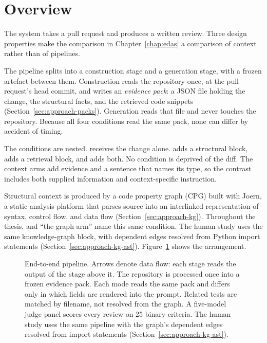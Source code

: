 \section{Overview}
\label{sec:approach-overview}

The system takes a pull request and produces a written review. Three design
properties make the comparison in Chapter~\ref{chap:edas} a comparison of
context rather than of pipelines.

The pipeline splits into a construction stage and a generation stage, with a
frozen artefact between them. Construction reads the repository once, at the
pull request's head commit, and writes an \emph{evidence pack}: a JSON file
holding the change, the structural facts, and the retrieved code snippets
(Section~\ref{sec:approach-packs}). Generation reads that file and never
touches the repository. Because all four conditions read the same pack, none
can differ by accident of timing.

The conditions are nested. \baseline{} receives the change alone. \kg{} adds a
structural block, \rag{} adds a retrieval block, and \hybrid{} adds both. No
condition is deprived of the diff. The context arms add evidence and a sentence
that names its type, so the contrast includes both supplied information and
context-specific instruction.

Structural context is produced by a code property graph (CPG) built with
Joern, a static-analysis platform that parses source into an interlinked
representation of syntax, control flow, and data flow
(Section~\ref{sec:approach-kg}). Throughout the thesis, \kg{} and ``the
graph arm'' name this same condition. The human study uses the same
knowledge-graph block, with dependent edges resolved from Python import
statements (Section~\ref{sec:approach-kg-ast}). Figure~\ref{fig:pipeline}
shows the arrangement.

\begin{figure}[htbp]
    \centering
    \resizebox{0.92\textwidth}{!}{%
    }
    \caption{End-to-end pipeline. Arrows denote data flow: each stage
             reads the output of the stage above it. The repository is
             processed once into a frozen evidence pack. Each mode reads the
             same pack and differs only in which fields are rendered into the
             prompt. Related tests are matched by filename, not resolved from
             the graph. A five-model judge panel scores every review on 25
             binary criteria. The human study uses the same pipeline with the
             graph's dependent edges resolved from import statements
             (Section~\ref{sec:approach-kg-ast}).}
    \label{fig:pipeline}
\end{figure}

